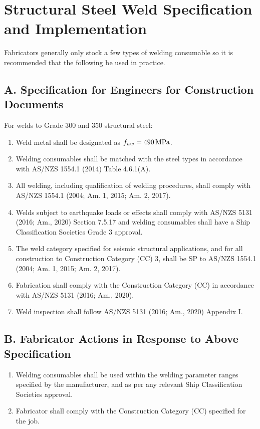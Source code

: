\chapter{Structural Steel Weld Specification and Implementation}
Fabricators generally only stock a few types of welding consumable so it is recommended that the following be used in practice.
\section*{A. Specification for Engineers for Construction Documents}
For welds to Grade 300 and 350 structural steel:
\begin{enumerate}
\item Weld metal shall be designated as $f_{uw}=\SI{490}{\mega\pascal}$.
\item Welding consumables shall be matched with the steel types in accordance with AS/NZS 1554.1 (2014) Table 4.6.1(A).
\item All welding, including qualification of welding procedures, shall comply with AS/NZS 1554.1 (2004; Am. 1, 2015; Am. 2, 2017).
\item Welds subject to earthquake loads or effects shall comply with AS/NZS 5131 (2016; Am., 2020) Section 7.5.17 and welding consumables shall have a Ship Classification Societies Grade 3 approval.
\item The weld category specified for seismic structural applications, and for all construction to Construction Category (CC) 3, shall be SP to AS/NZS 1554.1 (2004; Am. 1, 2015; Am. 2, 2017).
\item Fabrication shall comply with the Construction Category (CC) in accordance with AS/NZS 5131 (2016; Am., 2020).
\item Weld inspection shall follow AS/NZS 5131 (2016; Am., 2020) Appendix I.
\end{enumerate}
\section*{B. Fabricator Actions in Response to Above Specification}
\begin{enumerate}
\item Welding consumables shall be used within the welding parameter ranges specified by the manufacturer, and as per any relevant Ship Classification Societies approval.
\item Fabricator shall comply with the Construction Category (CC) specified for the job.
\end{enumerate}
